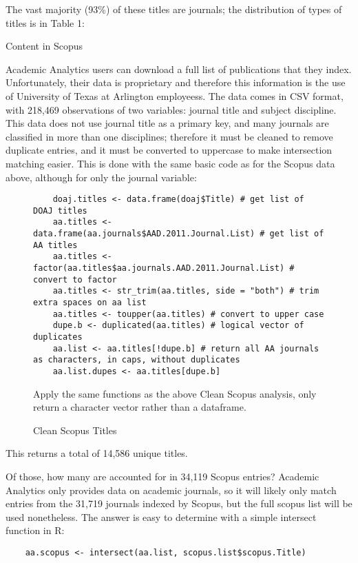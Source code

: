 \documentclass{article}
\begin{document}
The vast majority (93\%) of these titles are journals; the distribution of types of titles is in Table 1:
\begin{table}
	\centering
	\caption{Content in Scopus}
\end{table}

Academic Analytics users can download a full list of publications that they index. 
Unfortunately, their data is proprietary and therefore this information is the use of University of Texas at Arlington employeess. 
The data comes in CSV format, with 218,469 observations of two variables: journal title and subject discipline.
This data does not use journal title as a primary key, and many journals are classified in more than one disciplines; therefore it must be cleaned to remove duplicate entries, and it must be converted to uppercase to make intersection matching easier.
This is done with the same basic code as for the Scopus data above, although for only the journal variable:
\begin{figure}
	\centering
	\begin{lstlisting}
	doaj.titles <- data.frame(doaj$Title) # get list of DOAJ titles
	aa.titles <- data.frame(aa.journals$AAD.2011.Journal.List) # get list of AA titles
	aa.titles <- factor(aa.titles$aa.journals.AAD.2011.Journal.List) # convert to factor
	aa.titles <- str_trim(aa.titles, side = "both") # trim extra spaces on aa list
	aa.titles <- toupper(aa.titles) # convert to upper case
	dupe.b <- duplicated(aa.titles) # logical vector of duplicates
	aa.list <- aa.titles[!dupe.b] # return all AA journals as characters, in caps, without duplicates
	aa.list.dupes <- aa.titles[dupe.b]
	\end{lstlisting}
	\footnotesize{
		Apply the same functions as the above Clean Scopus analysis, only return a character vector rather than a dataframe. 
			}
	\caption{Clean Scopus Titles}
\end{figure}

This returns a total of 14,586 unique titles.

Of those, how many are accounted for in 34,119 Scopus entries?
Academic Analytics only provides data on academic journals, so it will likely only match entries from the 31,719 journals indexed by Scopus, but the full scopus list will be used nonetheless.
The answer is easy to determine with a simple intersect function in R:
\begin{lstlisting}
	aa.scopus <- intersect(aa.list, scopus.list$scopus.Title)
\end{lstlisting}
\end{document}

